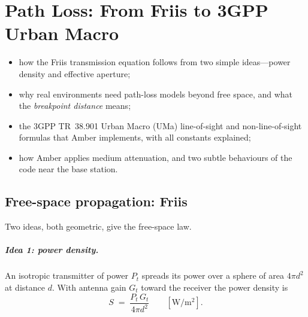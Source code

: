 \chapter{Path Loss: From Friis to 3GPP Urban Macro}
\label{ch:pathloss}

\begin{defbox}
\begin{itemize}
 \item how the Friis transmission equation follows from two simple ideas---power density and effective aperture;
 \item why real environments need path-loss models beyond free space, and what the \emph{breakpoint distance} means;
 \item the 3GPP TR~38.901 Urban Macro (UMa) line-of-sight and non-line-of-sight formulas that Amber implements, with all constants explained;
 \item how Amber applies medium attenuation, and two subtle behaviours of the code near the base station.
\end{itemize}
\end{defbox}

\section{Free-space propagation: Friis}
\label{sec:friis}

Two ideas, both geometric, give the free-space law.

\paragraph{Idea 1: power density.}
An isotropic transmitter of power $P_t$ spreads its power over a sphere of
area $4\pi d^2$ at distance $d$. With antenna gain $G_t$ toward the receiver the power
density is
\[
 S \;=\; \frac{P_t\,G_t}{4\pi d^2}\qquad[\mathrm{W/m^2}].
\]

